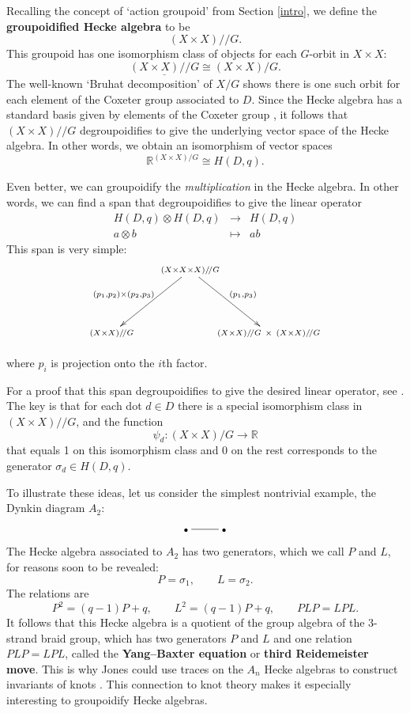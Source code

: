 \documentclass{article}
\renewcommand{\to}{\rightarrow}
\newcommand{\tensor}{\otimes}
\newcommand{\maps}{\colon}
\newcommand{\R}{{\mathbb R}}
\newcommand{\Over}{/\!/}
\renewcommand{\u}[1]{\underline{#1}}
\begin{document}
Recalling the concept of `action groupoid' from Section \ref{intro},
we define the {\bf groupoidified Hecke algebra} to be
\[ (X \times X)\Over G. \]
This groupoid has one isomorphism class of objects for each $G$-orbit
in $X \times X$:
\[ \u{(X \times X)\Over G} \cong (X \times X)/G. \]
The well-known `Bruhat decomposition' \cite{Borel} of 
$X/G$ shows there is one such orbit for each element of the Coxeter group 
associated to $D$.  Since the Hecke algebra has a standard basis given
by elements of the Coxeter group \cite{Humphreys}, it follows that
$(X \times X)\Over G$ degroupoidifies to give the underlying vector 
space of the Hecke algebra.  In other words, we obtain an
isomorphism of vector spaces
\[   \R^{(X \times X)/G} \cong H(D,q) .\]

Even better, we can groupoidify the {\it multiplication} in the Hecke
algebra.  In other words, we can find a span that degroupoidifies to
give the linear operator
\[  
\begin{array}{ccc} 
     H(D,q) \tensor H(D,q) & \to & H(D,q)   \\
         a \tensor b       & \mapsto & ab 
\end{array}
\]
This span is very simple:
\begin{equation}
\label{multiplication}
  \def\objectstyle{\scriptstyle}
  \def\labelstyle{\scriptstyle}
   \xy
   (0,30)*+{(X \times X \times X)\Over G}="1";
   (25,10)*+{(X\times X)\Over G \;\,\times\;\, (X\times X)\Over G}="2";
   (-25,10)*+{(X\times X)\Over G}="3";
        {\ar_{(p_1,p_2)\times (p_2,p_3)} "1";"3"};
        {\ar^{(p_1,p_3)} "1";"2"};
\endxy
\end{equation}
where $p_i$ is projection onto the $i$th factor.

For a proof that this span degroupoidifies to give the desired
linear operator, see \cite{Hoffnung}.
The key is that for each dot $d \in D$ there is a special
isomorphism class in $(X \times X)\Over G$, and the function 
\[   \psi_d \maps (X \times X)/G \to \R \]
that equals 1 on this isomorphism class and 0 on the rest 
corresponds to the generator $\sigma_d \in H(D,q)$.  

To illustrate these ideas, let us consider the simplest nontrivial
example, the Dynkin diagram $A_2$:
\[\xymatrix{ \bullet\ar@{-}[r] & \bullet}\]
The Hecke algebra associated to $A_2$ has two generators, which we
call $P$ and $L$, for reasons soon to be revealed:
\[        P = \sigma_1 , \qquad L = \sigma_2 . \]
The relations are
\[     P^2 = (q-1) P + q, \qquad L^2= (q-1)P + q,  \qquad PLP=LPL  .\]
It follows that this Hecke algebra is a quotient of the group algebra
of the 3-strand braid group, which has two generators $P$ and $L$ and
one relation $PLP = LPL$, called the {\bf Yang--Baxter equation} or
{\bf third Reidemeister move}.  This is why Jones could use traces on
the $A_n$ Hecke algebras to construct invariants of knots
\cite{Jones}.  This connection to knot theory makes it especially
interesting to groupoidify Hecke algebras.
\end{document}
